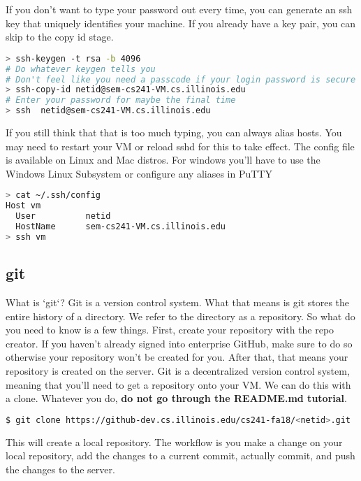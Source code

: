 If you don't want to type your password out every time, you can generate an ssh key that uniquely identifies your machine. If you already have a key pair, you can skip to the copy id stage.

\begin{lstlisting}[language=bash]
> ssh-keygen -t rsa -b 4096
# Do whatever keygen tells you
# Don't feel like you need a passcode if your login password is secure
> ssh-copy-id netid@sem-cs241-VM.cs.illinois.edu
# Enter your password for maybe the final time
> ssh  netid@sem-cs241-VM.cs.illinois.edu
\end{lstlisting}

If you still think that that is too much typing, you can always alias hosts.
You may need to restart your VM or reload sshd for this to take effect.
The config file is available on Linux and Mac distros.
For windows you'll have to use the Windows Linux Subsystem or configure any aliases in PuTTY

\begin{lstlisting}[language=bash]
> cat ~/.ssh/config
Host vm
  User          netid
  HostName      sem-cs241-VM.cs.illinois.edu
> ssh vm
\end{lstlisting}

\subsection{git}

What is `git`? Git is a version control system. What that means is git stores the entire history of a directory. We refer to the directory as a repository. So what do you need to know is a few things. First, create your repository with the repo creator. If you haven't already signed into enterprise GitHub, make sure to do so otherwise your repository won't be created for you. After that, that means your repository is created on the server. Git is a decentralized version control system, meaning that you'll need to get a repository onto your VM. We can do this with a clone. Whatever you do, \textbf{do not go through the README.md tutorial}.

\begin{lstlisting}[language=bash]
$ git clone https://github-dev.cs.illinois.edu/cs241-fa18/<netid>.git
\end{lstlisting}

This will create a local repository. The workflow is you make a change on your local repository, add the changes to a current commit, actually commit, and push the changes to the server.

